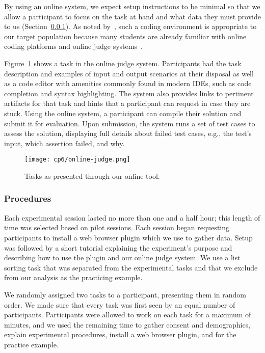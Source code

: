 By using an online system, we expect setup instructions to be minimal 
so that we allow a participant to focus on the task at hand and what data they must provide to us (Section~\ref{cp6:evaluation-procedures}).
As noted by~, such a coding environment is appropriate to our target population 
because many students are already familiar with online coding platforms and online judge systems~. 


Figure~\ref{fig:online-judge} shows a task in the online judge system. 
Participants had the task description and examples of input and output scenarios at their disposal as well as a code editor with amenities commonly found in modern IDEs, such as code completion and syntax highlighting. The system also provides links to pertinent artifacts for that task and hints that a participant can request in case they are stuck.
Using the online system, a participant can compile their solution and submit it for evaluation.
Upon submission, the system runs a set of test cases to assess the solution, 
 displaying full details about failed test cases, e.g., the test's input, which assertion failed, and why. 


\begin{figure}
    \centering
    \texttt{[image: cp6/online-judge.png]}
    \caption{Tasks as presented through our online tool. }
    \label{fig:online-judge}
\end{figure}





\subsubsection{Procedures}
\label{cp6:evaluation-procedures}


Each experimental session lasted no more than one and a half hour; this length of time was selected based on \red{\#} pilot sessions. 
Each session began requesting participants to install a web browser plugin which we use to gather data. Setup was followed by a short tutorial explaining the experiment's purpose and describing how to use the plugin and our online judge system. We use a list sorting task that was separated from the experimental tasks and that we exclude from our analysis as the practicing example. 


We randomly assigned two tasks to a participant, presenting them in random order.  We made sure that every task was first seen by an equal number of participants. Participants were allowed to work on each task for a maximum of  minutes, and we used the remaining time to gather consent and demographics, explain experimental procedures, install a web browser plugin, and for the practice example. 



